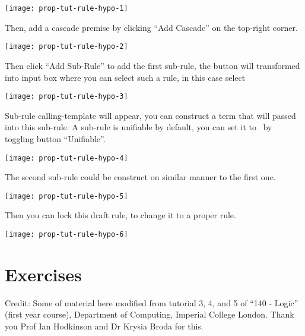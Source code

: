 \documentclass[master.tex]{subfiles}
\begin{document}
\begin{center}
  \texttt{[image: prop-tut-rule-hypo-1]}
\end{center}

Then, add a cascade premise by clicking ``Add Cascade'' on the top-right corner.

\begin{center}
  \texttt{[image: prop-tut-rule-hypo-2]}
\end{center}

Then click ``Add Sub-Rule'' to add the first sub-rule, the button will
transformed into input box where you can select such a rule, in this case select

\begin{center}
  \texttt{[image: prop-tut-rule-hypo-3]}
\end{center}

Sub-rule calling-template will appear, you can construct a term that will passed
into this sub-rule. A sub-rule is unifiable by default, you can set it to
\kExactMatch\ by toggling button ``Unifiable''.

\begin{center}
  \texttt{[image: prop-tut-rule-hypo-4]}
\end{center}

The second sub-rule could be construct on similar manner to the first one.

\begin{center}
  \texttt{[image: prop-tut-rule-hypo-5]}
\end{center}

Then you can lock this draft rule, to change it to a proper rule.

\begin{center}
  \texttt{[image: prop-tut-rule-hypo-6]}
\end{center}

\newpage

\section{Exercises}

Credit: Some of material here modified from tutorial 3, 4, and 5 of ``140 -
Logic'' (first year course), Department of Computing, Imperial College London.
Thank you Prof Ian Hodkinson and Dr Krysia Broda for this.
\end{document}
